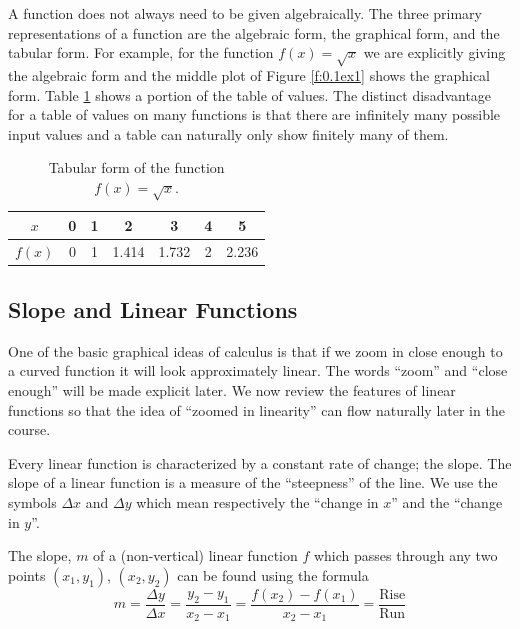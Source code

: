 A function does not always need to be given algebraically.  The three primary
representations of a function are the algebraic form, the graphical form, and the tabular
form.  For example, for the function $f(x) = \sqrt{x}$ we are explicitly giving the
algebraic form and the middle plot of Figure \ref{f:0.1ex1} shows the graphical form.
Table \ref{t:0.1ex1} shows a portion of the table of values.  The distinct disadvantage
for a table of values on many functions is that there are infinitely many possible input
values and a table can naturally only show finitely many of them.

\begin{table}[ht!]
    \centering
    \begin{tabular}{|c||c|c|c|c|c|c|}
        \hline
        $x$ & 0 & 1 & 2 & 3 & 4 & 5 \\ \hline
        $f(x)$ & 0 & 1 & 1.414 & 1.732 & 2 & 2.236 \\ \hline
    \end{tabular}
    \caption{Tabular form of the function $f(x) = \sqrt{x}$.}
    \label{t:0.1ex1}
\end{table}






\subsection*{Slope and Linear Functions}
One of the basic graphical ideas of calculus is that if we zoom in close enough to a
curved function it will look approximately linear.  The words ``zoom'' and ``close
enough'' will be made explicit later.  We now review the features of linear functions so
that the idea of ``zoomed in linearity'' can flow naturally later in the course.  

Every linear function is characterized by a constant rate of change; the slope.  The slope
of a linear function is a measure of the ``steepness'' of the line.  We use the symbols
$\Delta x$ and $\Delta y$ which mean respectively the ``change in $x$'' and the ``change in
$y$''.  
\begin{definition}[slope]
    The slope, $m$ of a (non-vertical) linear function $f$ which passes through any
    two points $(x_1,y_1)$, $(x_2,y_2)$ can be found using the formula
    \[ m = \frac{\Delta y}{\Delta x} = \frac{y_2 - y_1}{x_2 - x_1} =
    \frac{f(x_2)-f(x_1)}{x_2-x_1} = \frac{\text{Rise}}{\text{Run}} \]
\end{definition}

